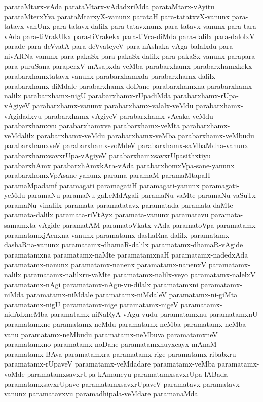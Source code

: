 {parataMtarx-vAda
parataMtarx-vAdadxriMda
parataMtarx-vAyitu
parataMterxYva
parataMtarxyX-vanunx
parataH
para-tatatxvX-vanunx
para-tatavx-vanUnx
para-tatavx-dalilx
para-tatavxnunx
para-tatavx-vanunx
para-tara-vAda
para-tiVrakUkx
para-tiVrakekx
para-tiVra-diMda
para-dalilx
para-dalolxV
parade
para-deVvatA
para-deVvateyeV
para-nAshaka-vAga-balalxdu
para-nivARNa-vanunx
para-pakaSx
para-pakaSx-dalilx
para-pakaSx-vanunx
parapara
para-puruSana
paraperxV-mAsapxda-veMba
parabarxhamx
parabarxhamxkekx
parabarxhamxtatavx-vanunx
parabarxhamxda
parabarxhamx-dalilx
parabarxhamx-diMdale
parabarxhamx-doDane
parabarxhamxna
parabarxhamx-nalilx
parabarxhamx-nigU
parabarxhamx-rUpadiMda
parabarxhamx-rUpa-vAgiyeV
parabarxhamx-vanunx
parabarxhamx-valalx-veMdu
parabarxhamx-vAgidadxvu
parabarxhamx-vAgiyeV
parabarxhamx-vAcaka-veMdu
parabarxhamxvu
parabarxhamxve
parabarxhamx-veMta
parabarxhamx-veMdalilx
parabarxhamx-veMdu
parabarxhamx-veMba
parabarxhamx-veMbudu
parabarxhamxveV
parabarxhamx-voMdeV
parabarxhamx-saMbaMdha-vanunx
parabarxhamxsavxrUpa-vAgiyeV
parabarxhamxsavxrUpasithxtiyu
parabarxhAmx
parabarxhAmxkAra-vAda
parabarxhomxVpa-sane-yanunx
parabarxhomxVpAsane-yanunx
parama
paramaM
paramaMtapaH
paramaMpadamf
paramagati
paramagatiH
paramagati-yanunx
paramagati-yeMdu
paramaNu
paramaNu-gaLeMdAgali
paramaNu-vaMte
paramaNu-vaSuTx
paramaNu-vinalilx
paramata
paramatatavx
paramatada
paramata-daMte
paramata-dalilx
paramata-riVtAyx
paramata-vanunx
paramatavu
paramata-samamxta-vAgide
paramatAM
paramatoVkatx-vAda
paramatoVpa
paramatamx
paramatamxjAcnxna-vanunx
paramatamx-dashaRna-dalilx
paramatamx-dashaRna-vanunx
paramatamx-dhamaR-dalilx
paramatamx-dhamaR-vAgide
paramatamxna
paramatamx-naMte
paramatamxnaH
paramatamx-nadedxAda
paramatamx-nanunx
paramatamx-nanenx
paramatamx-nanenxV
paramatamx-nalilx
paramatamx-nalilxru-vaMte
paramatamx-nalilx-veyo
paramatamx-nalelxV
paramatamx-nAgi
paramatamx-nAgu-vu-dilalx
paramatamxni
paramatamx-niMda
paramatamx-niMdale
paramatamx-niMdaleV
paramatamx-ni-giMta
paramatamx-nigU
paramatamx-nige
paramatamx-nigeV
paramatamx-nidAdxneMba
paramatamx-niNaRyA-vAgu-vudu
paramatamxnu
paramatamxnU
paramatamxne
paramatamx-neMdu
paramatamx-neMba
paramatamx-neMba-vanu
paramatamx-neMbudu
paramatamx-neMbuva
paramatamxneV
paramatamxno
paramatamx-noDane
paramatamxnuyxcayx-mAnaM
paramatamx-BAva
paramatamxra
paramatamx-rige
paramatamx-ribabxru
paramatamx-rUpaveV
paramatamx-veMdadare
paramatamx-veMba
paramatamx-voMde
paramatamxsavxrUpa-kAmaneyu
paramatamxsavxrUpa-lABada
paramatamxsavxrUpave
paramatamxsavxrUpaveV
paramatavx
paramatavx-vanunx
paramatavxvu
paramadhipala-veMdare
paramanaMda
}
